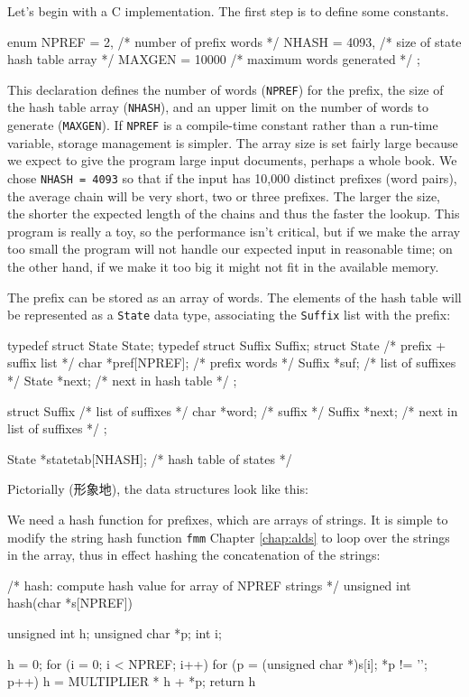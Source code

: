 Let's begin with a C implementation. The first step is to define some
constants.
\begin{wellcode}
    enum {
        NPREF   = 2,        /* number of prefix words */
        NHASH   = 4093,     /* size of state hash table array */
        MAXGEN  = 10000     /* maximum words generated */
    };
\end{wellcode}
This declaration defines the number of words (\verb'NPREF') for the prefix,
the size of the hash table array (\verb'NHASH'), and an upper limit on the
number of words to generate (\verb'MAXGEN'). If \verb'NPREF' is a
compile-time constant rather than a run-time variable, storage management
is simpler. The array size is set fairly large because we expect to give
the program large input documents, perhaps a whole book. We chose
\verb'NHASH = 4093' so that if the input has 10,000 distinct prefixes (word
pairs), the average chain will be very short, two or three prefixes. The
larger the size, the shorter the expected length of the chains and thus the
faster the lookup. This program is really a toy, so the performance isn't
critical, but if we make the array too small the program will not handle
our expected input in reasonable time; on the other hand, if we make it too
big it might not fit in the available memory.

The prefix can be stored as an array of words. The elements of the hash
table will be represented as a \verb'State' data type, associating the
\verb'Suffix' list with the prefix:
\begin{wellcode}
    typedef struct State State;
    typedef struct Suffix Suffix;
    struct State {  /* prefix + suffix list */
        char    *pref[NPREF];   /* prefix words */
        Suffix  *suf;           /* list of suffixes */
        State   *next;          /* next in hash table */
    };

    struct Suffix { /* list of suffixes */
        char    *word;  /* suffix */
        Suffix  *next;  /* next in list of suffixes */
    };

    State   *statetab[NHASH];   /* hash table of states */
\end{wellcode}
Pictorially (形象地), the data structures look like this:

We need a hash function for prefixes, which are arrays of strings. It is
simple to modify the string hash function \verb'fmm' Chapter
\ref{chap:alds} to loop over the strings in the array, thus in effect
hashing the concatenation of the strings:
\begin{wellcode}
    /* hash: compute hash value for array of NPREF strings */
    unsigned int hash(char *s[NPREF])
    {
        unsigned int    h;
        unsigned char   *p;
        int i;

        h = 0;
        for (i = 0; i < NPREF; i++)
            for (p = (unsigned char *)s[i]; *p != '\0'; p++)
                h = MULTIPLIER * h + *p;
        return h %
    }
\end{wellcode}

